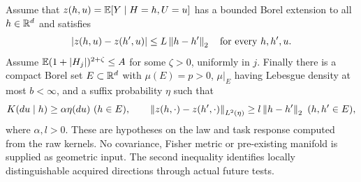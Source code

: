 Assume that $z(h,u)=\mathbb E[Y\mid H=h,U=u]$ has a bounded Borel extension to all $h\in\mathbb R^d$ and satisfies
\begin{equation}\label{eq:chartlip}
 |z(h,u)-z(h',u)|\le L\left\lVert h-h'\right\rVert_2
 \quad\text{for every }h,h',u.
\end{equation}
Assume $\mathbb E(1+|H_j|)^{2+\zeta}\le A$ for some $\zeta>0$, uniformly in $j$. Finally there is a compact Borel set $E\subset\mathbb R^d$ with $\mu(E)=p>0$, $\mu|_E$ having Lebesgue density at most $b<\infty$, and a suffix probability $\eta$ such that
\begin{equation}\label{eq:chartlower}
 K(du\mid h)\ge\alpha\eta(du)\ (h\in E),\qquad
 \left\lVert z(h,\cdot)-z(h',\cdot)\right\rVert_{L^2(\eta)}
 \ge l\left\lVert h-h'\right\rVert_2\ (h,h'\in E),
\end{equation}
where $\alpha,l>0$. These are hypotheses on the law and task response computed from the raw kernels. No covariance, Fisher metric or pre-existing manifold is supplied as geometric input. The second inequality identifies locally distinguishable acquired directions through actual future tests.


